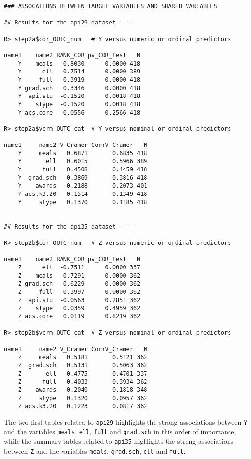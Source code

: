 \begin{verbatim}
### ASSOCATIONS BETWEEN TARGET VARIABLES AND SHARED VARIABLES

## Results for the api29 dataset -----

R> step2a$cor_OUTC_num   # Y versus numeric or ordinal predictors

name1    name2 RANK_COR pv_COR_test   N
    Y    meals  -0.8030      0.0000 418
    Y      ell  -0.7514      0.0000 389
    Y     full   0.3919      0.0000 418
    Y grad.sch   0.3346      0.0000 418
    Y  api.stu  -0.1520      0.0018 418
    Y    stype  -0.1520      0.0018 418
    Y acs.core  -0.0556      0.2566 418

R> step2a$vcrm_OUTC_cat  # Y versus nominal or ordinal predictors

name1     name2 V_Cramer CorrV_Cramer   N
    Y     meals   0.6871       0.6835 418
    Y       ell   0.6015       0.5966 389
    Y      full   0.4508       0.4459 418
    Y  grad.sch   0.3869       0.3816 418
    Y    awards   0.2188       0.2073 401
    Y acs.k3.20   0.1514       0.1349 418
    Y     stype   0.1370       0.1185 418


## Results for the api35 dataset -----

R> step2b$cor_OUTC_num   # Z versus numeric or ordinal predictors

name1    name2 RANK_COR pv_COR_test   N
    Z      ell  -0.7511      0.0000 337
    Z    meals  -0.7291      0.0000 362
    Z grad.sch   0.6229      0.0000 362
    Z     full   0.3997      0.0000 362
    Z  api.stu  -0.0563      0.2851 362
    Z    stype   0.0359      0.4959 362
    Z acs.core   0.0119      0.8219 362

R> step2b$vcrm_OUTC_cat  # Z versus nominal or ordinal predictors

name1     name2 V_Cramer CorrV_Cramer   N
    Z     meals   0.5181       0.5121 362
    Z  grad.sch   0.5131       0.5063 362
    Z       ell   0.4775       0.4701 337
    Z      full   0.4033       0.3934 362
    Z    awards   0.2040       0.1818 348
    Z     stype   0.1320       0.0957 362
    Z acs.k3.20   0.1223       0.0817 362
\end{verbatim}

The two first tables related to \texttt{api29} highlights the strong associations between \texttt{Y} and the variables \texttt{meals}, \texttt{ell}, \texttt{full} and \texttt{grad.sch} in this order of importance, while the summary tables related to \texttt{api35} highlights the strong associations between \texttt{Z} and the variables \texttt{meals}, \texttt{grad.sch}, \texttt{ell} and \texttt{full}.

